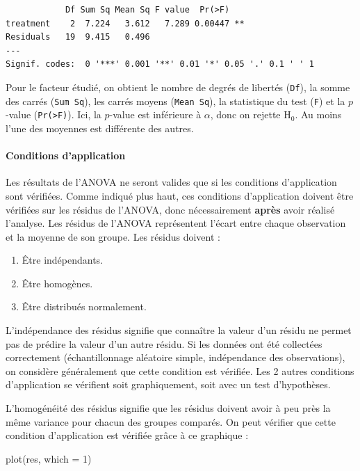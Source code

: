 \documentclass[
  a4paper,
]{article}
\newenvironment{Shaded}{\begin{snugshade}}{\end{snugshade}}
\newcommand{\AttributeTok}[1]{\textcolor[rgb]{0.00,0.34,0.68}{#1}}
\newcommand{\DecValTok}[1]{\textcolor[rgb]{0.69,0.50,0.00}{#1}}
\newcommand{\FunctionTok}[1]{\textcolor[rgb]{0.39,0.29,0.61}{#1}}
\newcommand{\NormalTok}[1]{\textcolor[rgb]{0.12,0.11,0.11}{#1}}
\providecommand{\tightlist}{%
  \setlength{\itemsep}{0pt}\setlength{\parskip}{0pt}}
\begin{document}
\begin{verbatim}
            Df Sum Sq Mean Sq F value  Pr(>F)   
treatment    2  7.224   3.612   7.289 0.00447 **
Residuals   19  9.415   0.496                   
---
Signif. codes:  0 '***' 0.001 '**' 0.01 '*' 0.05 '.' 0.1 ' ' 1
\end{verbatim}

Pour le facteur étudié, on obtient le nombre de degrés de libertés (\texttt{Df}), la somme des carrés (\texttt{Sum\ Sq}), les carrés moyens (\texttt{Mean\ Sq}), la statistique du test (\texttt{F}) et la \(p\)-value (\texttt{Pr(\textgreater{}F)}). Ici, la \(p\)-value est inférieure à \(\alpha\), donc on rejette H\(_0\). Au moins l'une des moyennes est différente des autres.

\hypertarget{CAANOVA}{%
\paragraph{Conditions d'application}\label{CAANOVA}}

Les résultats de l'ANOVA ne seront valides que si les conditions d'application sont vérifiées. Comme indiqué plus haut, ces conditions d'application doivent être vérifiées sur les résidus de l'ANOVA, donc nécessairement \textbf{après} avoir réalisé l'analyse. Les résidus de l'ANOVA représentent l'écart entre chaque observation et la moyenne de son groupe. Les résidus doivent :

\begin{enumerate}
\def\labelenumi{\arabic{enumi}.}
\tightlist
\item
  Être indépendants.
\item
  Être homogènes.
\item
  Être distribués normalement.
\end{enumerate}

L'indépendance des résidus signifie que connaître la valeur d'un résidu ne permet pas de prédire la valeur d'un autre résidu. Si les données ont été collectées correctement (échantillonnage aléatoire simple, indépendance des observations), on considère généralement que cette condition est vérifiée. Les 2 autres conditions d'application se vérifient soit graphiquement, soit avec un test d'hypothèses.

L'homogénéité des résidus signifie que les résidus doivent avoir à peu près la même variance pour chacun des groupes comparés. On peut vérifier que cette condition d'application est vérifiée grâce à ce graphique :

\begin{Shaded}
\begin{Highlighting}[]
\FunctionTok{plot}\NormalTok{(res, }\AttributeTok{which =} \DecValTok{1}\NormalTok{)}
\end{Highlighting}
\end{Shaded}
\end{document}
